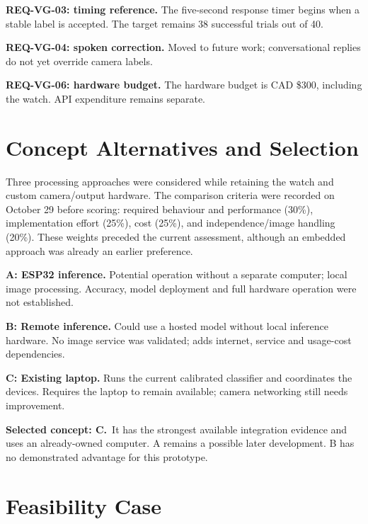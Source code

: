 \documentclass[conference,letterpaper]{IEEEtran}
\begin{document}
\noindent\textbf{REQ-VG-03: timing reference.} The five-second response timer begins when a stable label is accepted. The target remains 38 successful trials out of 40.\par

\noindent\textbf{REQ-VG-04: spoken correction.} Moved to future work; conversational replies do not yet override camera labels.\par

\noindent\textbf{REQ-VG-06: hardware budget.} The hardware budget is CAD \$300, including the watch. API expenditure remains separate.\par


\section{Concept Alternatives and Selection}

Three processing approaches were considered while retaining the
watch and custom camera/output hardware. The comparison criteria
were recorded on October 29 before scoring: required behaviour and
performance (30\%), implementation effort (25\%), cost (25\%), and
independence/image handling (20\%). These weights preceded the
current assessment, although an embedded approach was already an
earlier preference.

\noindent\textbf{A: ESP32 inference.} Potential operation without a separate computer; local image processing. Accuracy, model deployment and full hardware operation were not established.\par

\noindent\textbf{B: Remote inference.} Could use a hosted model without local inference hardware. No image service was validated; adds internet, service and usage-cost dependencies.\par

\noindent\textbf{C: Existing laptop.} Runs the current calibrated classifier and coordinates the devices. Requires the laptop to remain available; camera networking still needs improvement.\par

\textbf{Selected concept: C.}\ It has the strongest available integration evidence and uses an
already-owned computer. A remains a possible later development.
B has no demonstrated advantage for this prototype.




\section{Feasibility Case}
\end{document}
